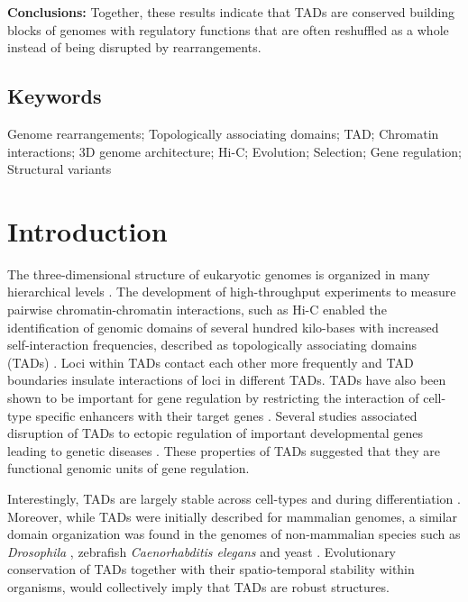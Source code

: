 \documentclass[a4paper,twoside=true,openright,parskip=full,chapterprefix=true,11pt,headings=normal,bibliography=totoc,listof=totoc,titlepage=on,captions=tableabove,draft=false]{scrreprt}
\theoremstyle{definition}
\theoremstyle{definition}
\theoremstyle{definition}
\theoremstyle{remark}
\begin{document}
\textbf{Conclusions:} Together, these results indicate that TADs are
conserved building blocks of genomes with regulatory functions that are
often reshuffled as a whole instead of being disrupted by
rearrangements.

\hypertarget{keywords}{%
\subsection*{Keywords}\label{keywords}}

Genome rearrangements; Topologically associating domains; TAD; Chromatin
interactions; 3D genome architecture; Hi-C; Evolution; Selection; Gene
regulation; Structural variants

\hypertarget{introduction-1}{%
\section{Introduction}\label{introduction-1}}

The three-dimensional structure of eukaryotic genomes is organized in
many hierarchical levels \citep{Bonev2016}. The development of
high-throughput experiments to measure pairwise chromatin-chromatin
interactions, such as Hi-C \citep{Lieberman-Aiden2009} enabled the
identification of genomic domains of several hundred kilo-bases with
increased self-interaction frequencies, described as topologically
associating domains (TADs) \citep{Dixon2012, Nora2012}. Loci within TADs
contact each other more frequently and TAD boundaries insulate
interactions of loci in different TADs. TADs have also been shown to be
important for gene regulation by restricting the interaction of
cell-type specific enhancers with their target genes
\citep{Nora2012, Symmons2014, Zhan2017}. Several studies associated
disruption of TADs to ectopic regulation of important developmental
genes leading to genetic diseases \citep{Ibn-Salem2014, Lupianez2015}.
These properties of TADs suggested that they are functional genomic
units of gene regulation.

Interestingly, TADs are largely stable across cell-types
\citep{Dixon2012, Rao2014} and during differentiation \citep{Dixon2015}.
Moreover, while TADs were initially described for mammalian genomes, a
similar domain organization was found in the genomes of non-mammalian
species such as \emph{Drosophila} \citep{Sexton2012}, zebrafish
\citep{Gomez-Marin2015} \emph{Caenorhabditis elegans} \citep{Crane2015}
and yeast \citep{Hsieh2015, Mizuguchi2014}. Evolutionary conservation of
TADs together with their spatio-temporal stability within organisms,
would collectively imply that TADs are robust structures.
\end{document}
